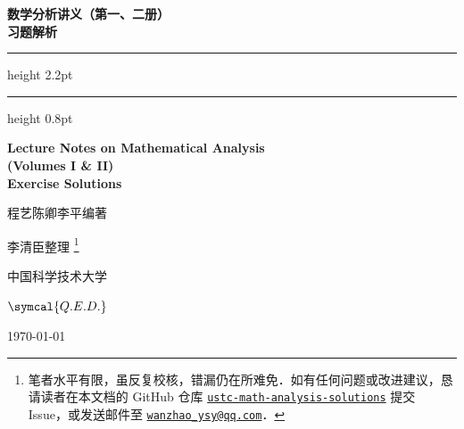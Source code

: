\cleardoublepage
{}
{}
\thispagestyle{empty}

\begin{center}

    {\fontsize{32pt}{38pt}\selectfont\rmfamily\bfseries\color{ThemeWine}
        数学分析讲义（第一、二册）\\[0.4em] 习题解析
    }

    \vspace{1.2cm}

    {\color{ThemeWine}\hrule height 2.2pt}
    \vspace{2.5pt}
    {\color{ThemeRose}\hrule height 0.8pt}

    \vspace{1.2cm}

    {\fontsize{18pt}{22pt}\selectfont\rmfamily\bfseries\color{ThemeDarkBlue}
        Lecture Notes on Mathematical Analysis\\[0.3em]
        {\large (Volumes I \& II)}
    } \\
    \vspace{0.6em}
    {\large\rmfamily\bfseries\color{ThemeDarkBlue} Exercise Solutions}


    {\large\kaishu\color{ThemeDarkBlue} 程\quad 艺\quad 陈\quad 卿\quad 李\quad 平\quad 编著}

    \vspace{0.6cm}

    {\Large\kaishu\color{ThemeDarkBlue} 李清臣\quad 整理} \footnote{%
        \color{ThemeDarkBlue}\rmfamily
        笔者水平有限，虽反复校核，错漏仍在所难免．如有任何问题或改进建议，恳请读者在本文档的 GitHub 仓库
        \href{https://github.com/wanzhao-ysy/ustc-math-analysis-solutions}{\texttt{ustc-math-analysis-solutions}}
        提交 Issue，或发送邮件至 \href{mailto:wanzhao_ysy@qq.com}{\texttt{wanzhao\_ysy@qq.com}}．
    }

    \vspace{0.4cm}
    {\large\kaishu\color{ThemeMidBlue} 中国科学技术大学}

    \vspace{2cm}

    {\color{ThemeRose}\Large $\symcal{Q.E.D.}$}

    \vspace{0.8cm}
    {\large\rmfamily\color{ThemeMidBlue}\today}

\end{center}

